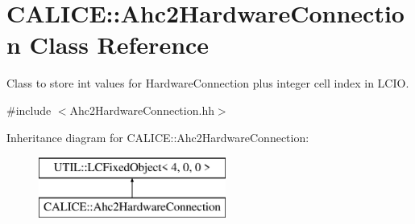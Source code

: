 \section{C\-A\-L\-I\-C\-E\-:\-:Ahc2\-Hardware\-Connection Class Reference}
\label{classCALICE_1_1Ahc2HardwareConnection}


Class to store int values for Hardware\-Connection plus integer cell index in L\-C\-I\-O.  




{\ttfamily \#include $<$Ahc2\-Hardware\-Connection.\-hh$>$}

Inheritance diagram for C\-A\-L\-I\-C\-E\-:\-:Ahc2\-Hardware\-Connection\-:\begin{figure}[H]
\begin{center}
\leavevmode
\includegraphics[height=2.000000cm]{classCALICE_1_1Ahc2HardwareConnection}
\end{center}
\end{figure}
